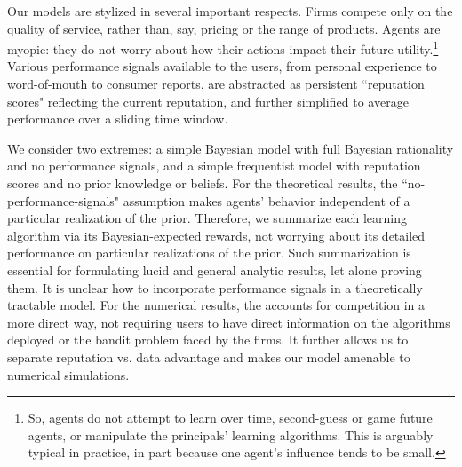 


Our models are stylized in several important  respects. Firms compete only on the quality of service, rather than, say, pricing or the range of products. Agents are myopic: they do not worry about how their actions impact their future utility.\footnote{So, agents do not attempt to learn over time, second-guess or game future agents, or manipulate the principals' learning algorithms. This is arguably typical in practice, in part because one agent's influence tends to be small.}  Various performance signals available to the users, from personal experience to word-of-mouth to consumer reports, are abstracted as persistent ``reputation scores" reflecting the current reputation, and further simplified to average performance over a sliding time window.

We consider two extremes: a simple Bayesian model with full Bayesian rationality and no performance signals, and a simple frequentist model with reputation scores and no prior knowledge or beliefs. For the theoretical results, the ``no-performance-signals" assumption makes agents' behavior independent of a particular realization of the prior. Therefore, we summarize each learning algorithm via its Bayesian-expected rewards, not worrying about its detailed performance on particular realizations of the prior.  Such summarization is essential for formulating lucid and general analytic results, let alone proving them. It is unclear how to incorporate performance signals in a theoretically tractable model. For the numerical results, the \ExptsModel accounts for competition in a more direct way,
not requiring users to have direct information on the algorithms deployed or the bandit problem faced by the firms. It further allows us to separate reputation vs. data advantage and makes our model amenable to numerical simulations.


